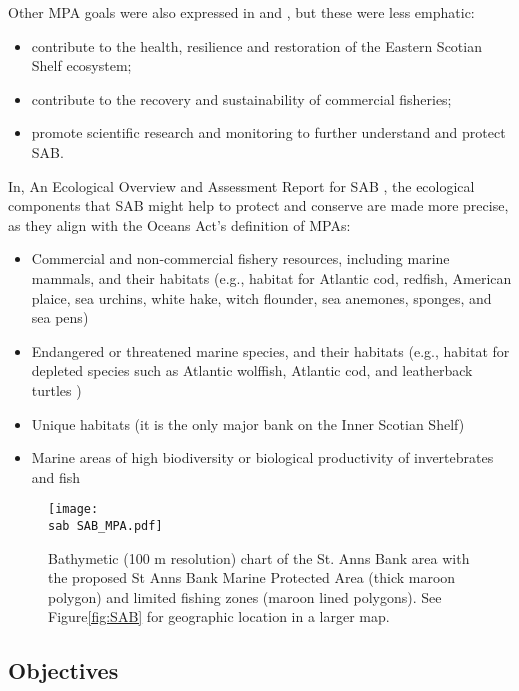 \documentclass[letterpaper,portrait,11pt]{scrartcl}
\numberwithin{equation}{section}		%
\numberwithin{figure}{section}		%
\numberwithin{table}{section}				%
\newcommand{\ecomod}{\string~/ecomod_data/}   %
\newcommand{\sab}{\ecomod/mpa/sab/}   %
\newcommand{\analysis}{\ecomod/mpa/analysis/}   %
\begin{document}
Other MPA goals were also expressed in \textcite{DFO:2012:conservation} and \textcite{Kenchington:2013:sab}, but these were less emphatic:

\begin{itemize}
	\item contribute to the health, resilience and restoration of the Eastern Scotian Shelf ecosystem;
	\item contribute to the recovery and sustainability of commercial fisheries; 
	\item promote scientific research and monitoring to further understand and protect SAB.
\end{itemize}

In, An Ecological Overview and Assessment Report for SAB \parencite{Ford:2013:sab},  the ecological components that SAB might help to protect and conserve are made more precise, as they align with the Oceans Act's definition of MPAs:

\begin{itemize}
	\item Commercial and non-commercial fishery resources, including marine mammals, and their habitats (e.g., habitat for Atlantic cod, redfish, American plaice, sea urchins, white hake, witch flounder, sea anemones, sponges, and sea pens)
  \item Endangered or threatened marine species, and their habitats (e.g., habitat for depleted species such as Atlantic wolffish, Atlantic cod, and leatherback turtles )
  \item Unique habitats (it is the only major bank on the Inner Scotian Shelf)
  \item Marine areas of high biodiversity or biological productivity of invertebrates and fish
\end{itemize}

\begin{figure}[h]

  \centering
  \texttt{[image: \\sab SAB\_MPA.pdf]}
  \caption{Bathymetic (100 m resolution) chart of the  St. Anns Bank area with the proposed St Anns Bank Marine Protected Area (thick maroon polygon) and limited fishing zones (maroon lined polygons). See Figure\ref{fig:SAB} for geographic location in a larger map.}
    \label{fig:SABCloseup}
\end{figure}

\subsection{Objectives}
\end{document}

